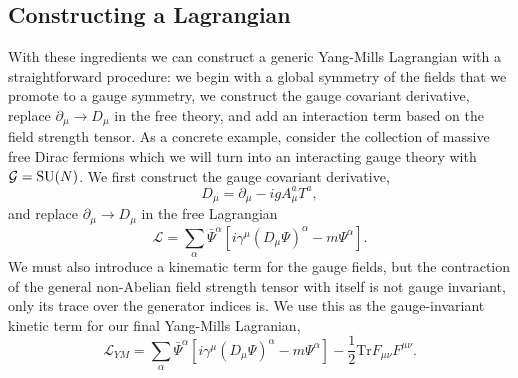 \subsection{Constructing a Lagrangian}
With these ingredients we can construct a generic Yang-Mills Lagrangian with a straightforward procedure: we begin with a global symmetry of the fields that we promote to a gauge symmetry, we construct the gauge covariant derivative, replace $\partial_{\mu} \rightarrow D_{\mu}$ in the free theory, and add an interaction term based on the field strength tensor. 
As a concrete example, consider the collection of massive free Dirac fermions which we will turn into an interacting gauge theory with $\mathcal{G} = {\mathrm{SU}(N)}$.
We first construct the gauge covariant derivative, 
\begin{equation}
    \label{eq:theory:generic_SUN_Dmu}
    D_{\mu} = \partial_{\mu} - igA_{\mu}^{a} T^{a},
\end{equation}
and replace $\partial_{\mu} \rightarrow D_{\mu}$ in the free Lagrangian
\begin{equation}
    \label{eq:theory:int_dirac_no_gauge_dynamics}
    \mathcal{L} = \sum_{\alpha} \bar{\Psi}^{\alpha}[i\gamma^{\mu}(D_{\mu}\Psi)^{\alpha} - m\Psi^{\alpha}].
\end{equation}
We must also introduce a kinematic term for the gauge fields, but the contraction of the general non-Abelian field strength tensor with itself is not gauge invariant, only its trace over the generator indices is. 
We use this as the gauge-invariant kinetic term for our final Yang-Mills Lagranian,
\begin{equation}
    \label{eq:theory:int_dirac_gauge_dynamics}
    \mathcal{L}_{YM} = \sum_{\alpha} \bar{\Psi}^{\alpha}[i\gamma^{\mu}(D_{\mu}\Psi)^{\alpha} - m\Psi^{\alpha}] - \frac{1}{2}\mathrm{Tr}F_{\mu\nu}F^{\mu\nu}.
\end{equation}
%
%

